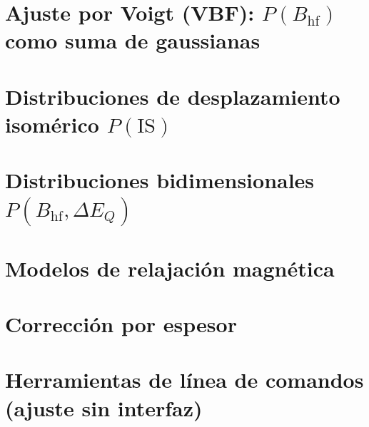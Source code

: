 \documentclass[11pt,a4paper]{report}
\newcommand{\BHF}{B_{\mathrm{hf}}}
\newcommand{\dEQ}{\Delta E_{Q}}
\begin{document}
\chapter[Ajuste por Voigt (VBF)]{Ajuste por Voigt (VBF): \texorpdfstring{$P(\BHF)$}{P(BHF)} como suma de gaussianas}
\label{ap:vbf}


\chapter{Distribuciones de desplazamiento isomérico \texorpdfstring{$P(\mathrm{IS})$}{P(IS)}}
\label{ap:dist-is}


\chapter{Distribuciones bidimensionales \texorpdfstring{$P(\BHF,\dEQ)$}{P(BHF,DEQ)}}
\label{ap:dist-2d}


\chapter{Modelos de relajación magnética}
\label{ap:relax}


\chapter{Corrección por espesor}
\label{ap:espesor}


\chapter[Herramientas de línea de comandos]{Herramientas de línea de comandos (ajuste sin interfaz)}
\label{ap:cli}

\end{document}
